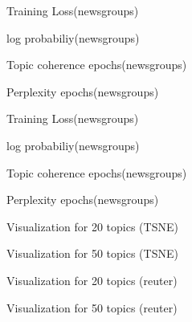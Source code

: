 \begin{figure}
\centering
\label{fig:training_loss}
\caption{Training Loss(newsgroups)}
\end{figure}
\begin{figure}
\centering
\label{fig:log_prob}
\caption{log probabiliy(newsgroups)}
\end{figure}
\begin{figure}
\centering
\label{fig:tc}
\caption{Topic coherence epochs(newsgroups)}
\end{figure}
\begin{figure}
\centering
\label{fig:ppl}
\caption{Perplexity epochs(newsgroups)}
\end{figure}
\begin{figure}
\centering
\label{fig:training_loss}
\caption{Training Loss(newsgroups)}
\end{figure}
\begin{figure}
\centering
\label{fig:log_prob}
\caption{log probabiliy(newsgroups)}
\end{figure}
\begin{figure}
\centering
\label{fig:tc}
\caption{Topic coherence epochs(newsgroups)}
\end{figure}
\begin{figure}
\centering
\label{fig:ppl}
\caption{Perplexity epochs(newsgroups)}
\end{figure}
\begin{figure}
\centering
\label{fig:tsne20newsgroups}
\caption{Visualization for 20 topics (TSNE)}
\end{figure}
\begin{figure}
\centering
\label{fig:tsne50newsgroups}
\caption{Visualization for 50 topics (TSNE)}
\end{figure}
\begin{figure}
\centering
\label{fig:tsne20reuters}
\caption{Visualization for 20 topics (reuter)}
\end{figure}
\begin{figure}
\centering
\label{fig:tsne50reuters}
\caption{Visualization for 50 topics (reuter)}
\end{figure}
